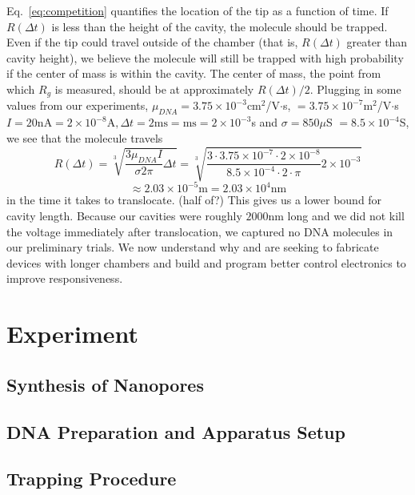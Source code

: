\documentclass[aps,prl,preprint,groupedaddress]{revtex4}
\begin{document}
Eq.~\ref{eq:competition} quantifies the location of the tip as a function of time. If \(R(\Delta t)\) is less than the height of the cavity, the molecule should be trapped. Even if the tip could travel outside of the chamber (that is, \(R(\Delta t)\) greater than cavity height), we believe the molecule will still be trapped with high probability if the center of mass is within the cavity. The center of mass, the point from which \(R_g\) is measured, should be at approximately \(R(\Delta t)/2\). Plugging in some values from our experiments, \(\mu_{DNA} = 3.75 \times 10^{-3}\)cm$^2$/V$\cdot$s, \( = 3.75 \times 10^{-7}\)m$^2$/V$\cdot$s \cite{mobility} \(I = 20 \mathrm{nA} = 2\times 10^{-8}\mathrm{A}, \Delta t = 2\mathrm{ms} = \mathrm{ms} = 2 \times 10^{-3}\)s and \(\sigma = 850\mu\)S \(= 8.5\times 10^{-4}\)S\cite{conductivity}, we see that the molecule travels \[R(\Delta t) = \sqrt[3]{\frac{3 \mu_{DNA} I}{\sigma 2 \pi}\Delta t} = \sqrt[3]{\frac{3\cdot 3.75\times 10^{-7}\cdot 2\times10^{-8}}{8.5\times10^{-4}\cdot 2\cdot \pi} 2\times10^{-3}}\] \[\approx 2.03 \times 10^{-5}\mathrm{m} = 2.03 \times 10^4 \mathrm{nm} \] in the time it takes to translocate. (half of?) This gives us a lower bound for cavity length. Because our cavities were roughly \(2000\)nm long and we did not kill the voltage immediately after translocation, we captured no DNA molecules in our preliminary trials. We now understand why and are seeking to fabricate devices with longer chambers and build and program better control electronics to improve responsiveness. 

\section{Experiment}

\subsection{Synthesis of Nanopores}



\subsection{DNA Preparation and Apparatus Setup}



\subsection{Trapping Procedure}
\end{document}

